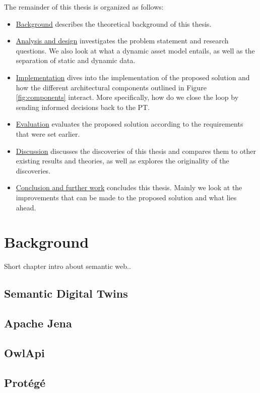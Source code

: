 \documentclass{article}
\begin{document}
The remainder of this thesis is organized as follows:
\begin{itemize}
    \item \hyperref[sec:Background]{Background} describes the theoretical background of this thesis.
    \item \hyperref[sec:Analysis]{Analysis and design} investigates the problem statement and research questions. We also look at what a dynamic asset model entails, as well as the separation of static and dynamic data.
    \item \hyperref[sec:Implementation]{Implementation} dives into the implementation of the proposed solution and how the different architectural components outlined in Figure \ref{fig:components} interact. More specifically, how do we close the loop by sending informed decisions back to the PT. 
    \item \hyperref[sec:Evaluation]{Evaluation} evaluates the proposed solution according to the requirements that were set earlier.
    \item \hyperref[sec:Discussion]{Discussion} discusses the discoveries of this thesis and compares them to other existing results and theories, as well as explores the originality of the discoveries.
    \item \hyperref[sec:Conclusion]{Conclusion and further work} concludes this thesis. Mainly we look at the improvements that can be made to the proposed solution and what lies ahead.  
\end{itemize}



\newpage
\section{Background}\label{sec:Background}
Short chapter intro about semantic web..

\subsection{Semantic Digital Twins}
\subsection{Apache Jena}
\subsection{OwlApi}
\subsection{Protégé}
\end{document}
